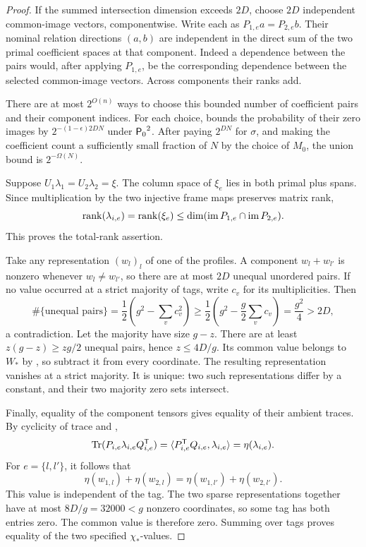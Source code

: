 \begin{proof}
If the summed intersection dimension exceeds \(2D\), choose \(2D\) independent common-image vectors, componentwise.
Write each as \(P_{1,e}a=P_{2,e}b\).
Their nominal relation directions \((a,b)\) are independent in the direct sum of the two primal coefficient spaces at that component.
Indeed a dependence between the pairs would, after applying \(P_{1,e}\), be the corresponding dependence between the selected common-image vectors.
Across components their ranks add.

There are at most \(2^{O(n)}\) ways to choose this bounded number of coefficient pairs and their component indices.
For each choice,  bounds the probability of their zero images by \(2^{-(1-\epsilon)2DN}\) under \({\mathsf P_0}^2\).
After paying \(2^{DN}\) for \(\sigma\), and making the coefficient count a sufficiently small fraction of \(N\) by the choice of \(M_0\), the union bound is \(2^{-\Omega(N)}\).

Suppose \(U_1\lambda_1=U_2\lambda_2=\xi\).
The column space of \(\xi_e\) lies in both primal plus spans.
Since multiplication by the two injective frame maps preserves matrix rank,
\[
 \operatorname{rank}(\lambda_{i,e})=\operatorname{rank}(\xi_e)
 \le\dim(\operatorname{im} P_{1,e}\cap\operatorname{im} P_{2,e}).
\]
This proves the total-rank assertion.

Take any representation \((w_l)_l\) of one of the profiles.
A component \(w_l+w_{l'}\) is nonzero whenever \(w_l\ne w_{l'}\), so there are at most \(2D\) unequal unordered pairs.
If no value occurred at a strict majority of tags, write \(c_v\) for its multiplicities.
Then
\[
 \#\{\text{unequal pairs}\}
 =\frac12\left(g^2-\sum_vc_v^2\right)
 \ge\frac12\left(g^2-\frac g2\sum_vc_v\right)
 =\frac{g^2}{4}>2D,
\]
a contradiction.
Let the majority have size \(g-z\).
There are at least \(z(g-z)\ge zg/2\) unequal pairs, hence \(z\le4D/g\).
Its common value belongs to \(W_*\) by , so subtract it from every coordinate.
The resulting representation vanishes at a strict majority.
It is unique: two such representations differ by a constant, and their two majority zero sets intersect.

Finally, equality of the component tensors gives equality of their ambient traces.
By cyclicity of trace and ,
\[
 \operatorname{Tr}(P_{i,e}\lambda_{i,e}Q_{i,e}^{\mathsf T})
 =\langle P_{i,e}^{\mathsf T} Q_{i,e},\lambda_{i,e}\rangle
 =\eta(\lambda_{i,e}).
\]
For \(e=\{l,l'\}\), it follows that
\[
 \eta(w_{1,l})+\eta(w_{2,l})
 =\eta(w_{1,l'})+\eta(w_{2,l'}).
\]
This value is independent of the tag.
The two sparse representations together have at most \(8D/g=32000<g\) nonzero coordinates, so some tag has both entries zero.
The common value is therefore zero.
Summing over tags proves equality of the two specified \(\chi_*\)-values.
\end{proof}


